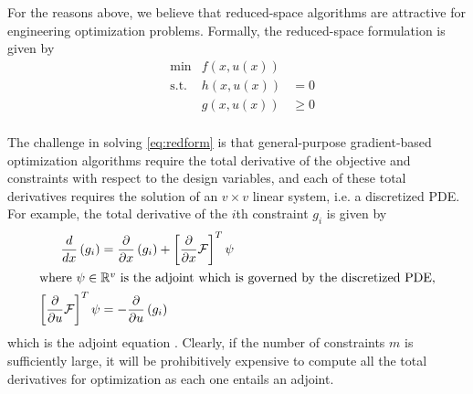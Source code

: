 \documentclass{article}
\makeatletter
\newcommand{\ie}[0]{{i.e.\@}\xspace}
\theoremstyle{definition}
\makeatother
\begin{document}
For the reasons above, we believe that reduced-space algorithms are attractive for engineering optimization problems.  Formally, the reduced-space formulation is given by 
\begin{equation}\label{eq:redform}
\begin{aligned}
&\text{min}   &f(x, u(x)) &\\
&\text{s.t.} & h(x,u(x)) &= 0   \\
& &  g(x,u(x)) &\geq 0 \\
\end{aligned}
\end{equation}

The challenge in solving \eqref{eq:redform} is that general-purpose gradient-based optimization algorithms \cite{Nocedal2006NO, Byrd:1999:IPA:588897.589167,gill:2002} require the total derivative of the objective and constraints with respect to the design variables, and each of these total derivatives requires the solution of an $v\times v$ linear system, \ie a discretized PDE.  For example, the total derivative of the $i$th constraint $g_i$ is given by
\begin{align}
\frac{d}{dx}\left(g_i\right) &= \frac{\partial}{\partial x}\left(g_i\right) + \left[ \frac{\partial}{\partial x}\mathcal{F} \right] ^T \psi \\
\intertext{where $\psi \in \mathbb{R}^v$ is the adjoint which is governed by the discretized PDE,}
\left[ \frac{\partial}{\partial u}\mathcal{F} \right]^T \psi &= - \frac{\partial}{\partial u}\left(g_i\right) 
\end{align}
which is the adjoint equation \cite{Jameson03aerodynamicshape}. Clearly, if the number of constraints $m$ is sufficiently large, it will be prohibitively expensive to compute all the total derivatives for optimization as each one entails an adjoint. 


\end{document}
